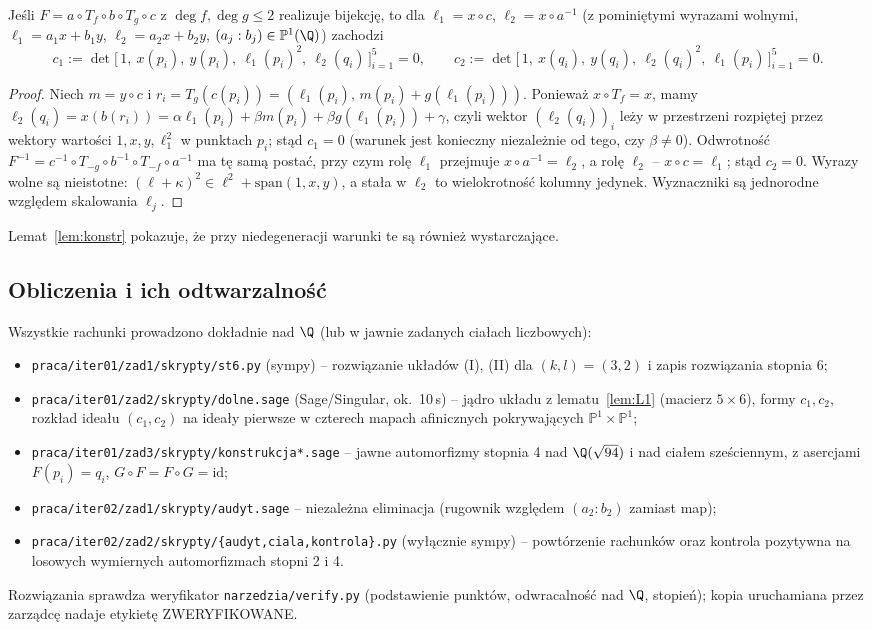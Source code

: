 \begin{lemat}\label{lem:wyzn}
Jeśli $F=a\circ T_f\circ b\circ T_g\circ c$ z $\deg f,\deg g\le2$ realizuje bijekcję, to dla
$\ell_1=x\circ c$, $\ell_2=x\circ a^{-1}$ (z pominiętymi wyrazami wolnymi,
$\ell_1=a_1x+b_1y$, $\ell_2=a_2x+b_2y$, $(a_j:b_j)\in\mathbb{P}^1(\Q)$) zachodzi
\[
c_1:=\det\bigl[\,1,\ x(p_i),\ y(p_i),\ \ell_1(p_i)^2,\ \ell_2(q_i)\,\bigr]_{i=1}^5=0,\qquad
c_2:=\det\bigl[\,1,\ x(q_i),\ y(q_i),\ \ell_2(q_i)^2,\ \ell_1(p_i)\,\bigr]_{i=1}^5=0.
\]
\end{lemat}
\begin{proof}
Niech $m=y\circ c$ i $r_i=T_g(c(p_i))=(\ell_1(p_i),\,m(p_i)+g(\ell_1(p_i)))$. Ponieważ
$x\circ T_f=x$, mamy $\ell_2(q_i)=x(b(r_i))=\alpha\ell_1(p_i)+\beta m(p_i)+\beta g(\ell_1(p_i))+\gamma$,
czyli wektor $(\ell_2(q_i))_i$ leży w przestrzeni rozpiętej przez wektory wartości $1,x,y,\ell_1^2$
w punktach $p_i$; stąd $c_1=0$ (warunek jest konieczny niezależnie od tego, czy $\beta\neq0$).
Odwrotność $F^{-1}=c^{-1}\circ T_{-g}\circ b^{-1}\circ T_{-f}\circ a^{-1}$ ma tę samą postać, przy
czym rolę $\ell_1$ przejmuje $x\circ a^{-1}=\ell_2$, a rolę $\ell_2$ -- $x\circ c=\ell_1$; stąd
$c_2=0$. Wyrazy wolne są nieistotne: $(\ell+\kappa)^2\in\ell^2+\mathrm{span}(1,x,y)$, a stała w
$\ell_2$ to wielokrotność kolumny jedynek. Wyznaczniki są jednorodne względem skalowania $\ell_j$.
\end{proof}
Lemat~\ref{lem:konstr} pokazuje, że przy niedegeneracji warunki te są również wystarczające.

\subsection{Obliczenia i ich odtwarzalność}
Wszystkie rachunki prowadzono dokładnie nad $\Q$ (lub w jawnie zadanych ciałach liczbowych):
\begin{itemize}
\item \texttt{praca/iter01/zad1/skrypty/st6.py} (sympy) -- rozwiązanie układów (I), (II) dla
  $(k,l)=(3,2)$ i zapis rozwiązania stopnia 6;
\item \texttt{praca/iter01/zad2/skrypty/dolne.sage} (Sage/Singular, ok.\ 10\,s) -- jądro układu
  z lematu~\ref{lem:L1} (macierz $5\times6$), formy $c_1,c_2$, rozkład ideału $(c_1,c_2)$ na
  ideały pierwsze w czterech mapach afinicznych pokrywających $\mathbb{P}^1\times\mathbb{P}^1$;
\item \texttt{praca/iter01/zad3/skrypty/konstrukcja*.sage} -- jawne automorfizmy stopnia 4 nad
  $\Q(\sqrt{94})$ i nad ciałem sześciennym, z asercjami $F(p_i)=q_i$, $G\circ F=F\circ G=\mathrm{id}$;
\item \texttt{praca/iter02/zad1/skrypty/audyt.sage} -- niezależna eliminacja (rugownik względem
  $(a_2:b_2)$ zamiast map);
\item \texttt{praca/iter02/zad2/skrypty/\{audyt,ciala,kontrola\}.py} (wyłącznie sympy) -- powtórzenie
  rachunków oraz kontrola pozytywna na losowych wymiernych automorfizmach stopni 2 i 4.
\end{itemize}
Rozwiązania sprawdza weryfikator \texttt{narzedzia/verify.py} (podstawienie punktów, odwracalność
nad $\Q$, stopień); kopia uruchamiana przez zarządcę nadaje etykietę ZWERYFIKOWANE.
